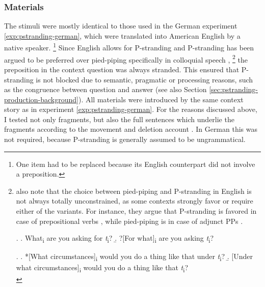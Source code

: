 \subsubsection{Materials} \label{sec:pstranding-english-materials}
The stimuli were mostly identical to those used in the German experiment \ref{exp:pstranding-german}, which were translated into American English by a native speaker.%
%
\footnote{One item had to be replaced because its English counterpart did not involve a preposition.}\afterfn%
%
Since English allows for P-stranding and P-stranding has been argued to be preferred over pied-piping specifically in colloquial speech \citep[628]{pullum.huddleston2002},%
%
\footnote{\citet[628--631]{pullum.huddleston2002} also note that the choice between pied-piping and P-stranding in English is not always totally unconstrained, as some contexts strongly favor or require either of the variants. For instance, they argue that P-stranding is favored in case of prepositional verbs \Next, while pied-piping is in case of adjunct PPs \NNext.\label{fn:piedpiping-en-restrictions}

\ex. \a. What\textsubscript{i} are you asking for \textit{t}\textsubscript{i}? \hfill \citep[629]{pullum.huddleston2002}
     \b. ?[For what]\textsubscript{i} are you asking \textit{t}\textsubscript{i}?
     
\ex. \a. *[What circumstances]\textsubscript{i} would you do a thing like that under \textit{t}\textsubscript{i}? 
     \b. [Under what circumstances]\textsubscript{i} would you do a thing like that \textit{t}\textsubscript{i}?\\\mbox{} \hfill \citep[631]{pullum.huddleston2002}
     
}\afterfn%
%
the preposition in the context question was always stranded. This ensured that P-stranding is not blocked due to semantic, pragmatic or processing reasons, such as the congruence between question and answer (see also Section \ref{sec:pstranding-production-background}). All materials were introduced by the same context story as in experiment \ref{exp:pstranding-german}. For the reasons discussed above, I tested not only fragments, but also the full sentences which underlie the fragments according to the movement and deletion account \Next. In German this was not required, because P-stranding is generally assumed to be ungrammatical.

